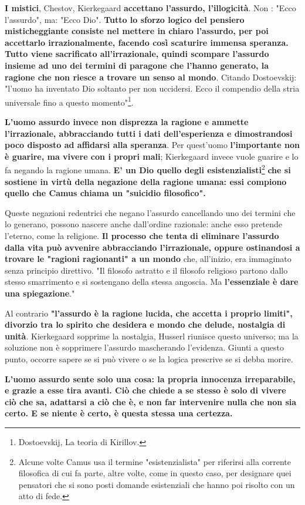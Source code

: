 \documentclass[a4paper,12pt,oneside]{article}%
\begin{document}
\textbf{I mistici}, Chestov, Kierkegaard \textbf{accettano l'assurdo, l'illogicità}. Non : "Ecco l'assurdo", ma: "Ecco Dio". \textbf{Tutto lo sforzo logico del pensiero misticheggiante consiste nel mettere in chiaro l'assurdo, per poi accettarlo irrazionalmente, facendo così scaturire immensa speranza. Tutto viene sacrificato all'irrazionale, quindi scompare l'assurdo insieme ad uno dei termini di paragone che l'hanno generato, la ragione che non riesce a trovare un senso al mondo}. Citando Dostoevskij: "l'uomo ha inventato Dio soltanto per non uccidersi. Ecco il compendio della stria universale fino a questo momento"\footnote{Dostoevskij, La teoria di Kirillov.}.

\textbf{L'uomo assurdo invece non disprezza la ragione e ammette l'irrazionale, abbracciando tutti i dati dell'esperienza e dimostrandosi poco disposto ad affidarsi alla speranza}. Per quest'uomo \textbf{l'importante non è guarire, ma vivere con i propri mali}; Kierkegaard invece vuole guarire e lo fa negando la ragione umana. \textbf{E' un Dio quello degli esistenzialisti}\footnote{Alcune volte Camus usa il termine "esistenzialista" per riferirsi alla corrente filosofica di cui fa parte, altre volte, come in questo caso, per designare quei pensatori che si sono posti domande esistenziali che hanno poi risolto con un atto di fede.} \textbf{che si sostiene in virtù della negazione della ragione umana: essi compiono quello che Camus chiama un "suicidio filosofico".}

Queste negazioni redentrici che negano l'assurdo cancellando uno dei termini che lo generano, possono nascere anche dall'ordine razionale: anche esso pretende l'eterno, come la religione. \textbf{Il processo che tenta di eliminare l'assurdo dalla vita può avvenire abbracciando l'irrazionale, oppure ostinandosi a trovare le "ragioni ragionanti" a un mondo} che, all'inizio, era immaginato senza principio direttivo. "Il filosofo astratto e il filosofo religioso partono dallo stesso smarrimento e si sostengano della stessa angoscia. Ma \textbf{l'essenziale è dare una spiegazione}."

Al contrario \textbf{"l'assurdo è la ragione lucida, che accetta i proprio limiti", divorzio tra lo spirito che desidera e mondo che delude, nostalgia di unità}. Kierkegaard sopprime la nostalgia, Husserl riunisce questo universo; ma la soluzione non è sopprimere l'assurdo mascherando l'evidenza. Giunti a questo punto, occorre sapere se si può vivere o se la logica prescrive se si debba morire.

\textbf{L'uomo assurdo sente solo una cosa: la propria innocenza irreparabile, e grazie a esse tira avanti. Ciò che chiede a se stesso è solo di vivere ciò che sa, adattarsi a ciò che è, e non far intervenire nulla che non sia certo. E se niente è certo, è questa stessa una certezza.}
\end{document}
